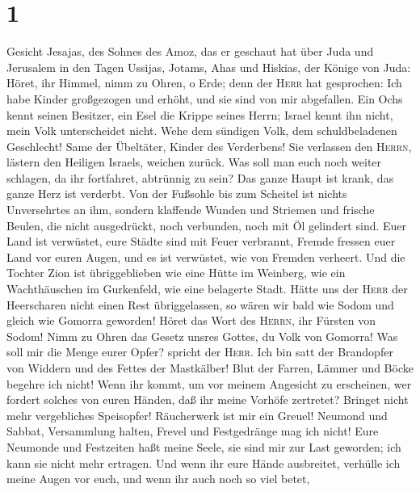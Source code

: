 \hypertarget{section}{%
\section{1}\label{section}}

 Gesicht Jesajas, des Sohnes des Amoz, das er geschaut hat
über Juda und Jerusalem in den Tagen Ussijas, Jotams,
Ahas\textquotesingle{} und Hiskias, der Könige von Juda: 
Höret, ihr Himmel, nimm zu Ohren, o Erde; denn der \textsc{Herr} hat
gesprochen: Ich habe Kinder großgezogen und erhöht, und sie sind von mir
abgefallen.  Ein Ochs kennt seinen Besitzer, ein Esel die
Krippe seines Herrn; Israel kennt ihn nicht, mein Volk unterscheidet
nicht.  Wehe dem sündigen Volk, dem schuldbeladenen
Geschlecht! Same der Übeltäter, Kinder des Verderbens! Sie verlassen den
\textsc{Herrn}, lästern den Heiligen Israels, weichen zurück.
 Was soll man euch noch weiter schlagen, da ihr
fortfahret, abtrünnig zu sein? Das ganze Haupt ist krank, das ganze Herz
ist verderbt.  Von der Fußsohle bis zum Scheitel ist
nichts Unversehrtes an ihm, sondern klaffende Wunden und Striemen und
frische Beulen, die nicht ausgedrückt, noch verbunden, noch mit Öl
gelindert sind.  Euer Land ist verwüstet, eure Städte sind
mit Feuer verbrannt, Fremde fressen euer Land vor euren Augen, und es
ist verwüstet, wie von Fremden verheert.  Und die Tochter
Zion ist übriggeblieben wie eine Hütte im Weinberg, wie ein
Wachthäuschen im Gurkenfeld, wie eine belagerte Stadt. 
Hätte uns der \textsc{Herr} der Heerscharen nicht einen Rest
übriggelassen, so wären wir bald wie Sodom und gleich wie Gomorra
geworden!  Höret das Wort des \textsc{Herrn}, ihr Fürsten
von Sodom! Nimm zu Ohren das Gesetz unsres Gottes, du Volk von Gomorra!
 Was soll mir die Menge eurer Opfer? spricht der
\textsc{Herr}. Ich bin satt der Brandopfer von Widdern und des Fettes
der Mastkälber! Blut der Farren, Lämmer und Böcke begehre ich nicht!
 Wenn ihr kommt, um vor meinem Angesicht zu erscheinen,
wer fordert solches von euren Händen, daß ihr meine Vorhöfe zertretet?
 Bringet nicht mehr vergebliches Speisopfer! Räucherwerk
ist mir ein Greuel! Neumond und Sabbat, Versammlung halten, Frevel und
Festgedränge mag ich nicht!  Eure Neumonde und Festzeiten
haßt meine Seele, sie sind mir zur Last geworden; ich kann sie nicht
mehr ertragen.  Und wenn ihr eure Hände ausbreitet,
verhülle ich meine Augen vor euch, und wenn ihr auch noch so viel betet,
